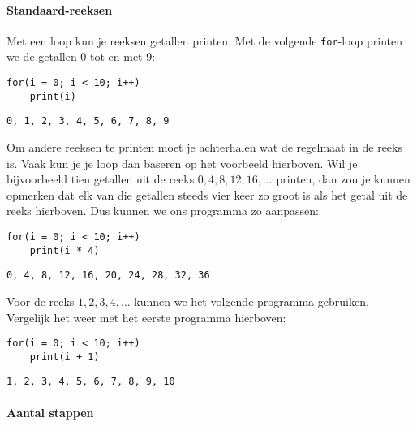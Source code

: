 \paragraph{Standaard-reeksen}

Met een loop kun je reeksen getallen printen. Met de volgende \texttt{for}-loop printen we de getallen 0 tot en met 9:

\begin{minipage}{0.45\textwidth}
\begin{verbatim}
for(i = 0; i < 10; i++)
    print(i)
\end{verbatim}
\end{minipage}
\vline\hfill
\begin{minipage}{0.45\textwidth}
\texttt{0, 1, 2, 3, 4, 5, 6, 7, 8, 9}
\end{minipage}

Om andere reeksen te printen moet je achterhalen wat de regelmaat in de reeks is. Vaak kun je je loop dan baseren op het voorbeeld hierboven. Wil je bijvoorbeeld tien getallen uit de reeks $0, 4, 8, 12, 16, ...$ printen, dan zou je kunnen opmerken dat elk van die getallen steeds vier keer zo groot is als het getal uit de reeks hierboven. Dus kunnen we ons programma zo aanpassen:

\begin{minipage}{0.45\textwidth}
\begin{verbatim}
for(i = 0; i < 10; i++)
    print(i * 4)
\end{verbatim}
\end{minipage}
\vline
\begin{minipage}{0.45\textwidth}
\hfill\mbox{\texttt{0, 4, 8, 12, 16, 20, 24, 28, 32, 36}}
\end{minipage}

Voor de reeks $1, 2, 3, 4, ...$ kunnen we het volgende programma gebruiken. Vergelijk het weer met het eerste programma hierboven:

\begin{minipage}{0.45\textwidth}
\begin{verbatim}
for(i = 0; i < 10; i++)
    print(i + 1)
\end{verbatim}
\end{minipage}
\vline\hfill
\begin{minipage}{0.45\textwidth}
\texttt{1, 2, 3, 4, 5, 6, 7, 8, 9, 10}
\end{minipage}

\paragraph{Aantal stappen}

